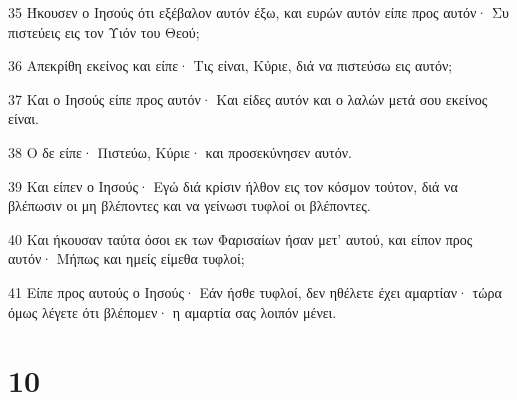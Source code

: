 \par 35 Ήκουσεν ο Ιησούς ότι εξέβαλον αυτόν έξω, και ευρών αυτόν είπε προς αυτόν· Συ πιστεύεις εις τον Υιόν του Θεού;
\par 36 Απεκρίθη εκείνος και είπε· Τις είναι, Κύριε, διά να πιστεύσω εις αυτόν;
\par 37 Και ο Ιησούς είπε προς αυτόν· Και είδες αυτόν και ο λαλών μετά σου εκείνος είναι.
\par 38 Ο δε είπε· Πιστεύω, Κύριε· και προσεκύνησεν αυτόν.
\par 39 Και είπεν ο Ιησούς· Εγώ διά κρίσιν ήλθον εις τον κόσμον τούτον, διά να βλέπωσιν οι μη βλέποντες και να γείνωσι τυφλοί οι βλέποντες.
\par 40 Και ήκουσαν ταύτα όσοι εκ των Φαρισαίων ήσαν μετ' αυτού, και είπον προς αυτόν· Μήπως και ημείς είμεθα τυφλοί;
\par 41 Είπε προς αυτούς ο Ιησούς· Εάν ήσθε τυφλοί, δεν ηθέλετε έχει αμαρτίαν· τώρα όμως λέγετε ότι βλέπομεν· η αμαρτία σας λοιπόν μένει.

\chapter{10}

